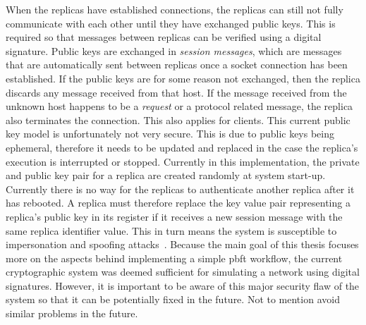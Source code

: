 When the replicas have established connections, the replicas can still not fully communicate with each other until they have exchanged public keys. This is required so that messages between replicas can be verified using a digital signature. Public keys are exchanged in \emph{session messages}, which are messages that are automatically sent between replicas once a socket connection has been established. If the public keys are for some reason not exchanged, then the replica discards any message received from that host. If the message received from the unknown host happens to be a \emph{request} or a protocol related message, the replica also terminates the connection. This also applies for clients. This current public key model is unfortunately not very secure. This is due to public keys being ephemeral, therefore it needs to be updated and replaced in the case the replica’s execution is interrupted or stopped. Currently in this implementation, the private and public key pair for a replica are created randomly at system start-up. Currently there is no way for the replicas to authenticate another replica after it has rebooted. A replica must therefore replace the key value pair representing a replica's public key in its register if it receives a new session message with the same replica identifier value. This in turn means the system is susceptible to impersonation and spoofing attacks~\cite{ WEB:spoofingAttack}. Because the main goal of this thesis focuses more on the aspects behind implementing a simple \ac{pbft} workflow, the current cryptographic system was deemed sufficient for simulating a network using digital signatures. However, it is important to be aware of this major security flaw of the system so that it can be potentially fixed in the future. Not to mention avoid similar problems in the future.


